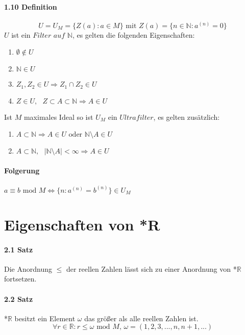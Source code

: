 \documentclass[a4paper]{article}
\begin{document}
\paragraph{1.10 Definition}  
$$ U = U_M = \{Z(a): a \in M\} \text{ mit } Z(a) = \{n \in \mathbb{N}: a^{(n)} = 0\} $$
$U $ ist ein $\textit{Filter auf } \mathbb{N} $, es gelten die folgenden Eigenschaften: 
\begin{enumerate}
      \item $ \emptyset \notin U $      
      \item $ \mathbb{N} \in U$ 
      \item $ Z_1, Z_2 \in U \Rightarrow Z_1 \cap Z_2 \in U$ 
      \item $ Z \in U, \text{ } Z \subset A \subset \mathbb{N} \Rightarrow A \in U$ 

\end{enumerate}
Ist $ M $ maximales Ideal so ist $ U_M $ ein $ Ultrafilter $, es gelten zusätzlich: 
\begin{enumerate}
      \item $ A \subset  \mathbb{N} \Rightarrow A \in U \text{ oder } \mathbb{N} \setminus A \in U$ 
      \item $ A \subset  \mathbb{N}, \text{ } |\mathbb{N} \setminus A| < \infty \Rightarrow A \in U$ 
\end{enumerate}

\paragraph{Folgerung} $a \equiv b \text{ mod } M \iff \{n: a^{(n)} = b^{(n)}\} \in U_M$



\section{Eigenschaften von *R}

\paragraph{2.1 Satz} Die Anordnung $\leqslant$ der reellen Zahlen lässt 
sich zu einer Anordnung von *$\mathbb{R}$ fortsetzen.

\paragraph{2.2 Satz} *$\mathbb{R}$ besitzt ein Element $ \omega $ das größer als alle reellen Zahlen ist. 
$$ \forall r \in \mathbb{R} : r \leqslant \omega \text{ mod } M \text{, } \omega = (1,2,3,...,n,n+1,...) $$
\end{document}
